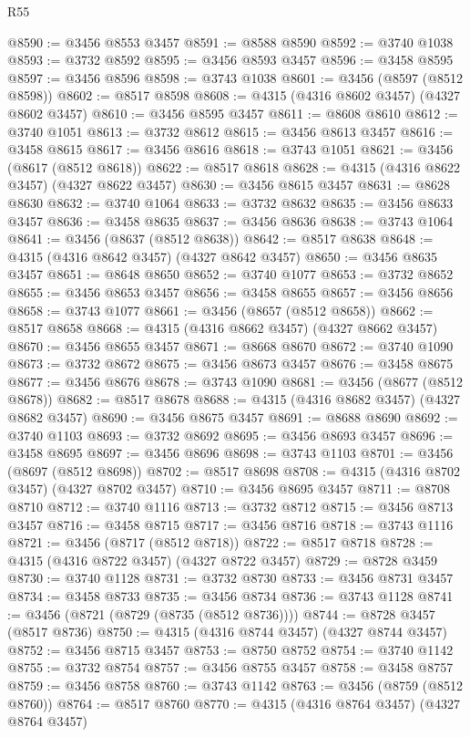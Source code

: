 \begin{lexlean}{R55}
\begin{coremodule}
@8590 := @3456 @8553 @3457
@8591 := @8588 @8590
@8592 := @3740 @1038
@8593 := @3732 @8592
@8595 := @3456 @8593 @3457
@8596 := @3458 @8595
@8597 := @3456 @8596
@8598 := @3743 @1038
@8601 := @3456 (@8597 (@8512 @8598))
@8602 := @8517 @8598
@8608 := @4315 (@4316 @8602 @3457) (@4327 @8602 @3457)
@8610 := @3456 @8595 @3457
@8611 := @8608 @8610
@8612 := @3740 @1051
@8613 := @3732 @8612
@8615 := @3456 @8613 @3457
@8616 := @3458 @8615
@8617 := @3456 @8616
@8618 := @3743 @1051
@8621 := @3456 (@8617 (@8512 @8618))
@8622 := @8517 @8618
@8628 := @4315 (@4316 @8622 @3457) (@4327 @8622 @3457)
@8630 := @3456 @8615 @3457
@8631 := @8628 @8630
@8632 := @3740 @1064
@8633 := @3732 @8632
@8635 := @3456 @8633 @3457
@8636 := @3458 @8635
@8637 := @3456 @8636
@8638 := @3743 @1064
@8641 := @3456 (@8637 (@8512 @8638))
@8642 := @8517 @8638
@8648 := @4315 (@4316 @8642 @3457) (@4327 @8642 @3457)
@8650 := @3456 @8635 @3457
@8651 := @8648 @8650
@8652 := @3740 @1077
@8653 := @3732 @8652
@8655 := @3456 @8653 @3457
@8656 := @3458 @8655
@8657 := @3456 @8656
@8658 := @3743 @1077
@8661 := @3456 (@8657 (@8512 @8658))
@8662 := @8517 @8658
@8668 := @4315 (@4316 @8662 @3457) (@4327 @8662 @3457)
@8670 := @3456 @8655 @3457
@8671 := @8668 @8670
@8672 := @3740 @1090
@8673 := @3732 @8672
@8675 := @3456 @8673 @3457
@8676 := @3458 @8675
@8677 := @3456 @8676
@8678 := @3743 @1090
@8681 := @3456 (@8677 (@8512 @8678))
@8682 := @8517 @8678
@8688 := @4315 (@4316 @8682 @3457) (@4327 @8682 @3457)
@8690 := @3456 @8675 @3457
@8691 := @8688 @8690
@8692 := @3740 @1103
@8693 := @3732 @8692
@8695 := @3456 @8693 @3457
@8696 := @3458 @8695
@8697 := @3456 @8696
@8698 := @3743 @1103
@8701 := @3456 (@8697 (@8512 @8698))
@8702 := @8517 @8698
@8708 := @4315 (@4316 @8702 @3457) (@4327 @8702 @3457)
@8710 := @3456 @8695 @3457
@8711 := @8708 @8710
@8712 := @3740 @1116
@8713 := @3732 @8712
@8715 := @3456 @8713 @3457
@8716 := @3458 @8715
@8717 := @3456 @8716
@8718 := @3743 @1116
@8721 := @3456 (@8717 (@8512 @8718))
@8722 := @8517 @8718
@8728 := @4315 (@4316 @8722 @3457) (@4327 @8722 @3457)
@8729 := @8728 @3459
@8730 := @3740 @1128
@8731 := @3732 @8730
@8733 := @3456 @8731 @3457
@8734 := @3458 @8733
@8735 := @3456 @8734
@8736 := @3743 @1128
@8741 := @3456 (@8721 (@8729 (@8735 (@8512 @8736))))
@8744 := @8728 @3457 (@8517 @8736)
@8750 := @4315 (@4316 @8744 @3457) (@4327 @8744 @3457)
@8752 := @3456 @8715 @3457
@8753 := @8750 @8752
@8754 := @3740 @1142
@8755 := @3732 @8754
@8757 := @3456 @8755 @3457
@8758 := @3458 @8757
@8759 := @3456 @8758
@8760 := @3743 @1142
@8763 := @3456 (@8759 (@8512 @8760))
@8764 := @8517 @8760
@8770 := @4315 (@4316 @8764 @3457) (@4327 @8764 @3457)

\end{coremodule}
\end{lexlean}
